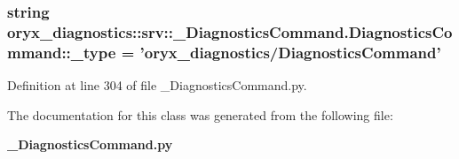 \subsubsection[{\-\_\-type}]{\setlength{\rightskip}{0pt plus 5cm}string {\bf oryx\-\_\-diagnostics\-::srv\-::\-\_\-\-Diagnostics\-Command.\-Diagnostics\-Command\-::\-\_\-type} = 'oryx\-\_\-diagnostics/{\bf \-Diagnostics\-Command}'\hspace{0.3cm}{\ttfamily  [static, private]}}\label{classoryx__diagnostics_1_1srv_1_1__DiagnosticsCommand_1_1DiagnosticsCommand_afbe0c13e9efa0c1392c7086557da7538}


\-Definition at line 304 of file \-\_\-\-Diagnostics\-Command.\-py.



\-The documentation for this class was generated from the following file\-:\begin{DoxyCompactItemize}
\item 
{\bf \-\_\-\-Diagnostics\-Command.\-py}\end{DoxyCompactItemize}

